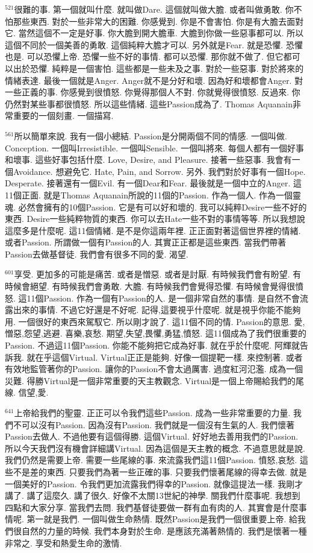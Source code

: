 \documentclass{book}
\begin{document}
$^{521}$很難的事.
第一個就叫什麼.
就叫做Dare.
這個就叫做大膽.
或者叫做勇敢.
你不怕那些東西.
對於一些非常大的困難.
你感覺到.
你是不會害怕.
你是有大膽去面對它.
當然這個不一定是好事.
你大膽到開大膽車.
大膽到你做一些惡事都可以.
所以這個不同於一個美善的勇敢.
這個純粹大膽才可以.
另外就是Fear.
就是恐懼.
恐懼也是.
可以恐懼上帝.
恐懼一些不好的事情.
都可以恐懼.
那你就不做了.
但它都可以出於恐懼.
純粹是一個害怕.
這些都是一些未及之事.
對於一些惡事.
對於將來的情緒表達.
最後一個就是Anger.
Anger就不是分好和壞.
因為好和壞都會Anger.
對一些正義的事.
你感覺到很憤怒.
你覺得那個人不對.
你就覺得很憤怒.
反過來.
你仍然對某些事都很憤怒.
所以這些情緒.
這些Passion成為了.
Thomas Aquanain非常重要的一個刻畫.
一個描寫.

$^{561}$所以簡單來說.
我有一個小總結.
Passion是分開兩個不同的情感.
一個叫做.
Conception.
一個叫Irresistible.
一個叫Sensible.
一個叫將來.
每個人都有一個好事和壞事.
這些好事包括什麼.
Love, Desire, and Pleasure.
接著一些惡事.
我會有一個Avoidance.
想避免它.
Hate, Pain, and Sorrow.
另外.
我們對於好事有一個Hope.
Desperate.
接著還有一個Evil.
有一個Dear和Fear.
最後就是一個中立的Anger.
這11個正面.
就是Thomas Aquanain所說的11個的Passion.
作為一個人.
作為一個靈魂.
必然會擁有的10個Passion.
它是有可以好和壞的.
我可以純粹Desire一些不好的東西.
Desire一些純粹物質的東西.
你可以去Hate一些不對的事情等等.
所以我想說這麼多是什麼呢.
這11個情緒.
是不是你這兩年裡.
正正面對著這個世界裡的情緒.
或者Passion.
所謂做一個有Passion的人.
其實正正都是這些東西.
當我們帶著Passion去做基督徒.
我們會有很多不同的愛.
渴望.

$^{601}$享受.
更加多的可能是痛苦.
或者是憎惡.
或者是討厭.
有時候我們會有盼望.
有時候會絕望.
有時候我們會勇敢.
大膽.
有時候我們會覺得恐懼.
有時候會覺得很憤怒.
這11個Passion.
作為一個有Passion的人.
是一個非常自然的事情.
是自然不會流露出來的事情.
不過它好還是不好呢.
記得,這要視乎什麼呢.
就是視乎你能不能夠用.
一個很好的東西來駕馭它.
所以剛才說了.
這11個不同的情.
Passion的意思.
愛,憎惡,怨望,逃避.
喜樂,哀愁.
期望,失望,畏懼,勇猛,憤怒.
這11個成為了我們很重要的Passion.
不過這11個Passion.
你能不能夠把它成為好事.
就在乎於什麼呢.
阿輝就告訴我.
就在乎這個Virtual.
Virtual正正是能夠.
好像一個提靶一樣.
來控制著.
或者有效地監管著你的Passion.
讓你的Passion不會太過厲害.
過度紅河氾濫.
成為一個災難.
得勝Virtual是一個非常重要的天主教觀念.
Virtual是一個上帝賜給我們的尾線.
信望,愛.

$^{641}$上帝給我們的聖靈.
正正可以令我們這些Passion.
成為一些非常重要的力量.
我們不可以沒有Passion.
因為沒有Passion.
我們就是一個沒有生氣的人.
我們懷著Passion去做人.
不過他要有這個得勝.
這個Virtual.
好好地去善用我們的Passion.
所以今天我們沒有機會詳細講Virtual.
因為這個是天主教的概念.
不過意思就是說.
我們仍然是需要上帝.
需要一些尾線的事.
來流露我們這11個Passion.
憤怒,哀愁.
這些不是差的東西.
只要我們為著一些正確的事.
只要我們懷著尾線的得幸去做.
就是一個美好的Passion.
令我們更加流露我們得幸的Passion.
就像這提法一樣.
我剛才講了.
講了這麼久.
講了很久.
好像不太關13世紀的神學.
關我們什麼事呢.
我想到四點和大家分享.
當我們去問.
我們基督徒要做一群有血有肉的人.
其實會是什麼事情呢.
第一就是我們.
一個叫做生命熱情.
既然Passion是我們一個很重要上帝.
給我們很自然的力量的時候.
我們本身對於生命.
是應該充滿著熱情的.
我們是懷著一種非常之.
享受和熱愛生命的激情.
\end{document}
